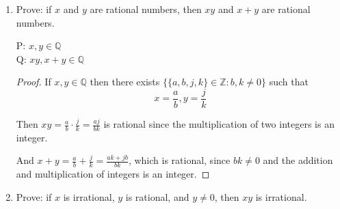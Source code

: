 \documentclass{article} %
\theoremstyle{plain}
\newtheorem*{theorem*}{Theorem}
\theoremstyle{definition}
\theoremstyle{case}
\begin{document}
\begin{enumerate}[label={\fbox{\textbf{Exercise \#\arabic* :}}}]
\begin{theorem*}
 \end{theorem*}

  \begin{proof}
    \underline{Base Case: } 
    \begin{align*}
      2^4 &= 16 \geq a_4 = a_3 + a_2 + a_1 = 8 + 4 + 2 = 14\\
      2^5 &= 32 \geq a_5 = a_4 + a_3 + a_2 = 14 + 8 + 4 = 26 \\
      2^6 &= 64 \geq a_6 = a_5 + a_4 + a_3  = 26 + 14 + 8 = 48
    \end{align*}

    \underline{Induction Step: } Let's assume the hypothesis holds for
    k:
    \begin{align*}
      2^{k-2} &\geq a_{k-2} = a_{k-3} + a_{k-4} + a_{k-5} \\
      2^{k-1} &\geq a_{k-1} = a_{k-2} + a_{k-3} + a_{k-4} \\
      2^{k} &\geq a_{k} = a_{k-1} + a_{k-2} + a_{k-3}
    \end{align*}
    So we need to show that
    \[ 2^{k+1} \geq a_{k} + a_{k-1} + a_{k-2} \]
    Subtracting $2^k$ from both sides we get
    \[ 2^{k+1} - 2^k \geq a_{k} + a_{k-1} + a_{k-2} -2^k \]
    \[ 2^k \geq a_{k} + a_{k-1} + a_{k-2} - 2^k\]
    But we know that $2^k \geq a_{k} + a_{k-1} + a_{k-2} $ so
    \[ 2^k \geq 0 \geq a_{k} + a_{k-1} + a_{k-2} - 2^k\]

  \end{proof}
  

\newpage
\item Prove: if $x$ and $y$ are rational numbers, then $xy$ and $x+y$ are rational numbers. 

P: $x, y \in \mathbb{Q}$\\
Q: $xy, x+y \in \mathbb{Q}$

\begin{proof}

  If $x, y \in \mathbb{Q} $ then there exists $\{ \{a,b,j,k\} \in \mathbb{Z}: b,k \neq 0 \}$
such that 
  \[x = \frac{a}{b}, y = \frac{j}{k} \]

  Then $xy = \frac{a}{b} \cdot \frac{j}{k} = \frac{aj}{bk} $ is rational
  since the multiplication of two integers is an integer.

  And $x+y = \frac{a}{b} + \frac{j}{k} = \frac{ak + jb}{bk} $, which is
  rational, since $bk \neq 0$ and the addition and multiplication 
  of integers is an integer.
\end{proof} 

\newpage
\item Prove: if $x$ is irrational, $y$ is rational, and $y \neq 0$, then $xy$ is irrational. 



\end{enumerate}
\end{document}

